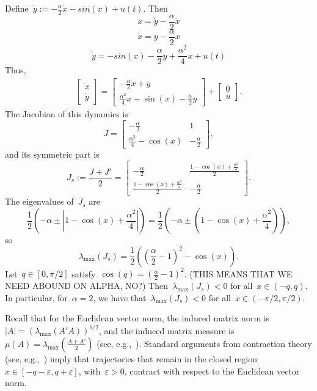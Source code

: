\documentclass[10pt,onecolumn,twoside,letter]{IEEEtran}
\theoremstyle{plain}
\begin{document}
Define~$\dot{y}:=-\frac{\alpha}{2}\dot{x} -sin(x)+u(t)$. Then
\[
            \ddot x =\dot y-\frac{\alpha}{2}\dot{x}   
\]
\[
          \dot x = y-\frac{\alpha}{2}x
\]
\[
          \dot y =-sin(x)-\frac{\alpha}{2}y+\frac{\alpha^2}{4}x + u(t)
\]
  Thus,
\begin{align*}
                \begin{bmatrix} \dot x \\ \dot y \end{bmatrix} = \begin{bmatrix} -\frac{\alpha}{2}x+y \\  \frac{\alpha^2}{4}x-\sin(x)-\frac{\alpha}{2} y \end{bmatrix}
                +\begin{bmatrix} 0 \\u \end{bmatrix}.
\end{align*}
The Jacobian of this dynamics is
\[
            J=\begin{bmatrix}   -\frac{\alpha}{ 2} & 1 \\\frac{\alpha^2}{4}-\cos(x) &-\frac{\alpha}{2}       
               \end{bmatrix},
\]
and its symmetric part is 
\[
            J_s:=\frac{J+J'}{2}= \begin{bmatrix}   -\frac{\alpha}{ 2} & \frac{  1-\cos(x)+\frac{\alpha^2}{4}}{2}\\
           \frac{  1-\cos(x)+\frac{\alpha^2}{4}}{2} &-\frac{\alpha}{2}
               \end{bmatrix}.
\]
The eigenvalues of~$J_s$ are
\[
             \frac{1}{2} \left(  -  {\alpha}  \pm   |  1-\cos(x)+\frac{\alpha^2}{4}  | \right)=\frac{1}{2} \left(  -  {\alpha}  \pm    (  1-\cos(x)+\frac{\alpha^2}{4} )   \right),
\]
so
\[
            \lambda_{\max}(J_s)=\frac{1}{2} \left(   (\frac{\alpha}{2}-1)^2 -\cos(x)     \right).
\]
Let~$q \in[0,\pi/2]$ satisfy~$\cos(q)=(\frac{\alpha}{2}-1)^2$.
(THIS MEANS THAT WE NEED ABOUND ON ALPHA, NO?)
Then~$ \lambda_{\max}(J_s)<0$ for all~$x\in(-q,q)$.
In particular, for~$\alpha=2$, we have that~$ \lambda_{\max}(J_s)<0$ for all~$x\in(-\pi/2,\pi/2)$.

 
Recall that for the Euclidean vector norm, the induced
matrix norm is~$|A|=(\lambda_{\max}(A'A))^{1/2} $,
 and the induced matrix measure is~$\mu(A)=\lambda_{\max}( \frac{A+A'}{2} )$ (see, e.g.,~\cite{vid}).
Standard arguments from contraction theory (see, e.g.,~\cite{LOHMILLER1998683,sontag_contraction_tutorial}) imply
that   trajectories that remain in the closed  region~$x \in [-q-\varepsilon,q+\varepsilon]$, with~$\varepsilon>0$,
contract with respect to the Euclidean  vector  norm. 
\end{document}

